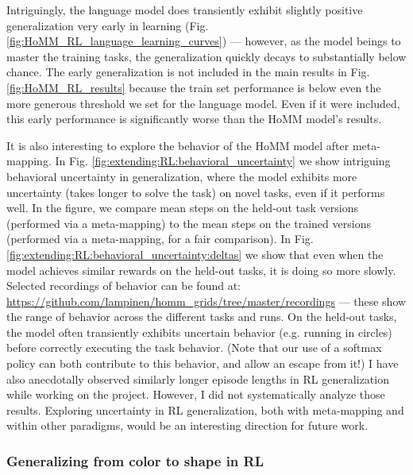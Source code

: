Intriguingly, the language model does transiently exhibit slightly positive generalization very early in learning (Fig. \ref{fig:HoMM_RL_language_learning_curves}) --- however, as the model beings to master the training tasks, the generalization quickly decays to substantially below chance. The early generalization is not included in the main results in Fig. \ref{fig:HoMM_RL_results} because the train set performance is below even the more generous threshold we set for the language model. Even if it were included, this early performance is significantly worse than the HoMM model's results. \par

It is also interesting to explore the behavior of the HoMM model after meta-mapping. In Fig. \ref{fig:extending:RL:behavioral_uncertainty} we show intriguing behavioral uncertainty in generalization, where the model exhibits more uncertainty (takes longer to solve the task) on novel tasks, even if it performs well. In the figure, we compare mean steps on the held-out task versions (performed via a meta-mapping) to the mean steps on the trained versions (performed via a meta-mapping, for a fair comparison). In Fig. \ref{fig:extending:RL:behavioral_uncertainty:deltas} we show that even when the model achieves similar rewards on the held-out tasks, it is doing so more slowly. Selected recordings of behavior can be found at: \url{https://github.com/lampinen/homm_grids/tree/master/recordings} --- these show the range of behavior across the different tasks and runs. On the held-out tasks, the model often transiently exhibits uncertain behavior (e.g. running in circles) before correctly executing the task behavior. (Note that our use of a softmax policy can both contribute to this behavior, and allow an escape from it!) I have also anecdotally observed similarly longer episode lengths in RL generalization while working on the \citet{Hill2019a} project. However, I did not systematically analyze those results. Exploring uncertainty in RL generalization, both with meta-mapping and within other paradigms, would be an interesting direction for future work.

\subsubsection{Generalizing from color to shape in RL} \label{sec:analyses:RL:color_to_shape}

